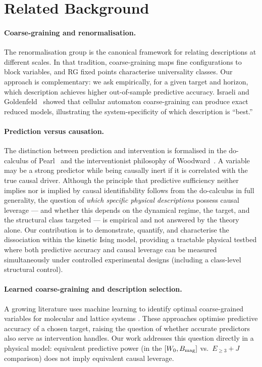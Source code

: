 \documentclass[aps,pre,preprint,superscriptaddress,showpacs]{revtex4-2}
\begin{document}
\section{Related Background}
\label{sec:background}

\paragraph{Coarse-graining and renormalisation.}
The renormalisation group \cite{kadanoff1966,wilson1975} is the
canonical framework for relating descriptions at different scales.
In that tradition, coarse-graining maps fine configurations to block
variables, and RG fixed points characterise universality classes.
Our approach is complementary: we ask empirically, for a given target and
horizon, which description achieves higher out-of-sample predictive accuracy.
Israeli and Goldenfeld~\cite{israeli2006} showed that cellular
automaton coarse-graining can produce exact reduced models, illustrating
the system-specificity of which description is ``best.''

\paragraph{Prediction versus causation.}
The distinction between prediction and intervention is formalised in the
do-calculus of Pearl~\cite{pearl2009} and the interventionist philosophy of
Woodward~\cite{woodward2003}.
A variable may be a strong predictor while being causally inert if it is
correlated with the true causal driver.
Although the principle that predictive sufficiency neither implies nor is
implied by causal identifiability follows from the do-calculus in full
generality, the question of \emph{which specific physical descriptions}
possess causal leverage — and whether this depends on the dynamical
regime, the target, and the structural class targeted — is empirical
and not answered by the theory alone.
Our contribution is to demonstrate, quantify, and characterise the
dissociation within the kinetic Ising model, providing a tractable
physical testbed where both predictive accuracy and causal leverage
can be measured simultaneously under controlled experimental designs
(including a class-level structural control).

\paragraph{Learned coarse-graining and description selection.}
A growing literature uses machine learning to identify optimal
coarse-grained variables for molecular and lattice systems
\cite{noe2019,wang2019}.
These approaches optimise predictive accuracy of a chosen target,
raising the question of whether accurate predictors also serve as
intervention handles.
Our work addresses this question directly in a physical model:
equivalent predictive power (in the $[W_0, B_{\rm mag}]$
vs.\ $E_{\geq 3}+J$ comparison) does not imply equivalent causal
leverage.
\end{document}
